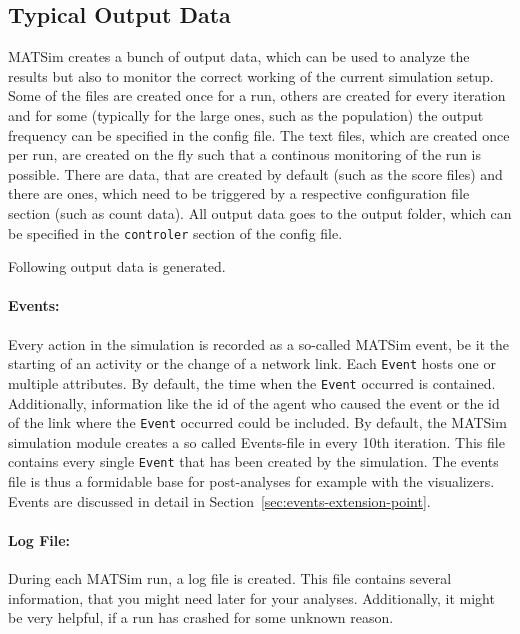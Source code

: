 \subsection{Typical Output Data}
\label{sec:outputdata}
MATSim creates a bunch of output data, which can be used to analyze the results but also to monitor the correct working of the current simulation setup. Some of the files are created once for a run, others are created for every iteration and for some (typically for the large ones, such as the population) the output frequency can be specified in the config file. The text files, which are created once per run, are created on the fly such that a continous monitoring of the run is possible. There are data, that are created by default (such as the score files) and there are ones, which need to be triggered by a respective configuration file section (such as count data). All output data goes to the output folder, which can be specified in the \lstinline|controler| section of the config file.

Following output data is generated.

\paragraph{Events:} Every action in the simulation is recorded as a so-called MATSim event, be it the starting of an activity or the change of a network link. Each \lstinline|Event| hosts one or multiple attributes. By default, the time when the \lstinline|Event| occurred is contained. Additionally, information like the id of the agent who caused the event or the id of the link where the \lstinline|Event| occurred could be included.  By default, the MATSim simulation module creates a so called Events-file in every 10th iteration. This file contains every single \lstinline|Event| that has been created by the simulation. The events file is thus a formidable base for post-analyses for example with the visualizers. Events are discussed in detail in Section~\ref{sec:events-extension-point}.

\paragraph{Log File:}
During each MATSim run, a log file is created. This file contains several information, that you might need later for your analyses. Additionally, it might be very helpful, if a run has crashed for some unknown reason. 

